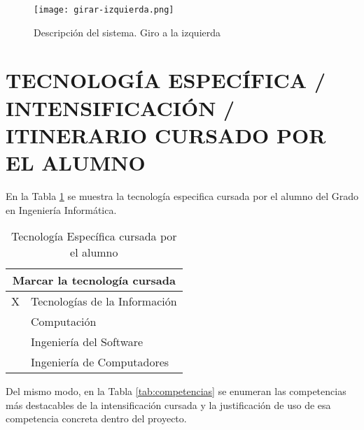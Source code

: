 \documentclass{pre-tfg}
\begin{document}
\begin{figure}[!h]
  \begin{center}
    \texttt{[image: girar-izquierda.png]}
    \caption{Descripción del sistema. Giro a la izquierda}
    \label{fig:descipcion_sistema}
  \end{center}
  \vspace{-35pt}
\end{figure}

\section{TECNOLOGÍA ESPECÍFICA / INTENSIFICACIÓN / ITINERARIO CURSADO POR EL ALUMNO}

En la Tabla \ref{tab:tec-especifica} se muestra la tecnología especifica cursada por el alumno del Grado en Ingeniería Informática.

\begin{table}[hp]
  \centering
  \caption{Tecnología Específica cursada por el alumno}
  \label{tab:tec-especifica}

  \begin{tabular}{l p{}}
    \multicolumn{2}{c}{\textbf{Marcar la tecnología cursada}} \\
    \hline
    X & Tecnologías de la Información \\
    ~ & Computación                   \\
    ~ & Ingeniería del Software       \\
    ~ & Ingeniería de Computadores    \\ \hline
  \end{tabular}
\end{table}

Del mismo modo, en la Tabla \ref{tab:competencias} se enumeran las competencias más destacables de la intensificación cursada y la justificación de uso de esa competencia concreta dentro del proyecto.
\end{document}
